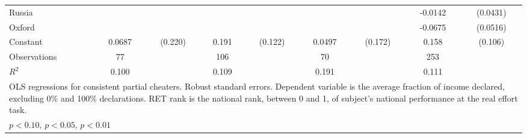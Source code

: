 {\begin{tabular}{l*{4}{cc}}
Russia          &                  &         &                  &         &                  &         &  -0.0142         & (0.0431)\\
Oxford          &                  &         &                  &         &                  &         &  -0.0675         & (0.0516)\\
Constant        &   0.0687         &  (0.220)&    0.191         &  (0.122)&   0.0497         &  (0.172)&    0.158         &  (0.106)\\
\hline
Observations    &       77         &         &      106         &         &       70         &         &      253         &         \\
\(R^{2}\)       &    0.100         &         &    0.109         &         &    0.191         &         &    0.111         &         \\
\hline\hline
\multicolumn{9}{p{16cm}}{\tiny OLS regressions for consistent partial cheaters. Robust standard errors. Dependent variable is the average fraction of income declared, excluding 0\% and 100\% declarations. RET rank is the national rank, between 0 and 1, of subject's national performance at the real effort task.}\\
\multicolumn{9}{l}{\footnotesize \sym{*} \(p<0.10\), \sym{**} \(p<0.05\), \sym{***} \(p<0.01\)}\\
\end{tabular}
}

